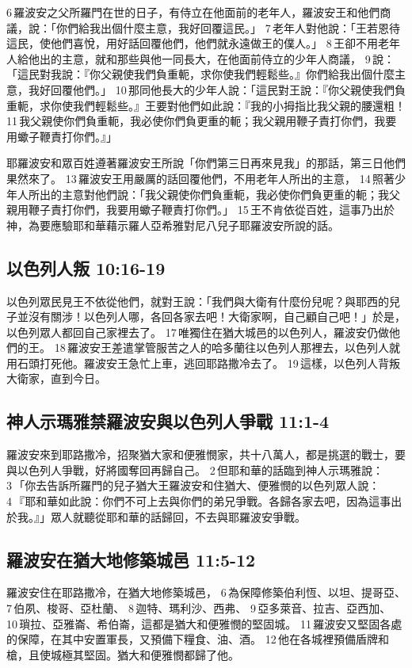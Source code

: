 6 羅波安之父所羅門在世的日子，有侍立在他面前的老年人，羅波安王和他們商議，說：「你們給我出個什麼主意，我好回覆這民。」 7 老年人對他說：「王若恩待這民，使他們喜悅，用好話回覆他們，他們就永遠做王的僕人。」 8 王卻不用老年人給他出的主意，就和那些與他一同長大，在他面前侍立的少年人商議， 9 說：「這民對我說：『你父親使我們負重軛，求你使我們輕鬆些。』你們給我出個什麼主意，我好回覆他們。」 10 那同他長大的少年人說：「這民對王說：『你父親使我們負重軛，求你使我們輕鬆些。』王要對他們如此說：『我的小拇指比我父親的腰還粗！ 11 我父親使你們負重軛，我必使你們負更重的軛；我父親用鞭子責打你們，我要用蠍子鞭責打你們。』」

耶羅波安和眾百姓遵著羅波安王所說「你們第三日再來見我」的那話，第三日他們果然來了。 13 羅波安王用嚴厲的話回覆他們，不用老年人所出的主意， 14 照著少年人所出的主意對他們說：「我父親使你們負重軛，我必使你們負更重的軛；我父親用鞭子責打你們，我要用蠍子鞭責打你們。」 15 王不肯依從百姓，這事乃出於神，為要應驗耶和華藉示羅人亞希雅對尼八兒子耶羅波安所說的話。

\subsection{以色列人叛 10:16-19}
以色列眾民見王不依從他們，就對王說：「我們與大衛有什麼份兒呢？與耶西的兒子並沒有關涉！以色列人哪，各回各家去吧！大衛家啊，自己顧自己吧！」於是，以色列眾人都回自己家裡去了。 17 唯獨住在猶大城邑的以色列人，羅波安仍做他們的王。 18 羅波安王差遣掌管服苦之人的哈多蘭往以色列人那裡去，以色列人就用石頭打死他。羅波安王急忙上車，逃回耶路撒冷去了。 19 這樣，以色列人背叛大衛家，直到今日。


\subsection{神人示瑪雅禁羅波安與以色列人爭戰 11:1-4}
羅波安來到耶路撒冷，招聚猶大家和便雅憫家，共十八萬人，都是挑選的戰士，要與以色列人爭戰，好將國奪回再歸自己。 2 但耶和華的話臨到神人示瑪雅說： 3 「你去告訴所羅門的兒子猶大王羅波安和住猶大、便雅憫的以色列眾人說： 4 『耶和華如此說：你們不可上去與你們的弟兄爭戰。各歸各家去吧，因為這事出於我。』」眾人就聽從耶和華的話歸回，不去與耶羅波安爭戰。


\subsection{羅波安在猶大地修築城邑 11:5-12}
羅波安住在耶路撒冷，在猶大地修築城邑， 6 為保障修築伯利恆、以坦、提哥亞、 7 伯夙、梭哥、亞杜蘭、 8 迦特、瑪利沙、西弗、 9 亞多萊音、拉吉、亞西加、 10 瑣拉、亞雅崙、希伯崙，這都是猶大和便雅憫的堅固城。 11 羅波安又堅固各處的保障，在其中安置軍長，又預備下糧食、油、酒。 12 他在各城裡預備盾牌和槍，且使城極其堅固。猶大和便雅憫都歸了他。


